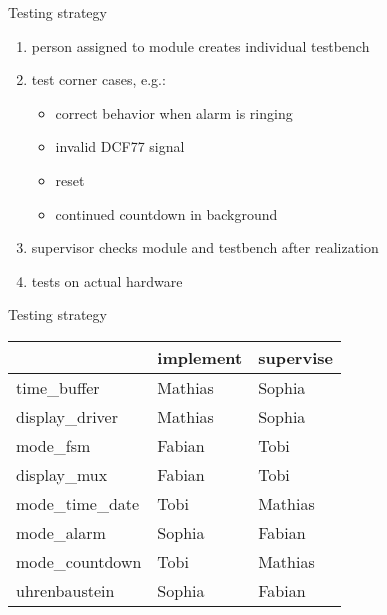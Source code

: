 \documentclass{beamer}
\begin{document}
\begin{frame}{Testing strategy}
	\begin{enumerate}
		\item person assigned to module creates individual testbench
		\item test corner cases, e.g.: \begin{itemize}
			\item correct behavior when alarm is ringing
			\item invalid DCF77 signal
			\item reset
			\item continued countdown in background
		\end{itemize}
		\item supervisor checks module and testbench after realization
		\item tests on actual hardware
	\end{enumerate}
\end{frame}

\begin{frame}{Testing strategy}
	\begin{center}
		\begin{tabular}{lll}
			\toprule
									& implement   & supervise  \\ \midrule
			time\_buffer      & Mathias     & Sophia     \\
			display\_driver   & Mathias     & Sophia     \\
			mode\_fsm         & Fabian      & Tobi       \\
			display\_mux      & Fabian      & Tobi       \\
			mode\_time\_date  & Tobi        & Mathias    \\
			mode\_alarm       & Sophia      & Fabian     \\
			mode\_countdown   & Tobi        & Mathias    \\
			uhrenbaustein     & Sophia      & Fabian     \\ \bottomrule
		\end{tabular}
	\end{center}
\end{frame}
\end{document}
